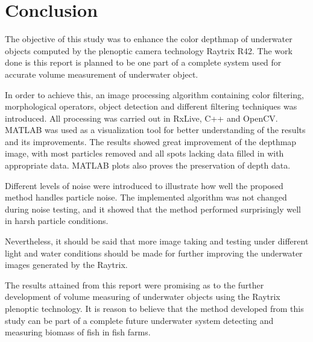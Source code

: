 \section{Conclusion}\label{conclusion}

The objective of this study was to enhance the color depthmap of underwater objects computed by the plenoptic camera technology Raytrix R42. The work done is this report is planned to be one part of a complete system used for accurate volume measurement of underwater object. 

In order to achieve this, an image processing algorithm containing color filtering, morphological operators, object detection and different filtering techniques was introduced. All processing was carried out in RxLive, C++ and OpenCV. MATLAB was used as a visualization tool for better understanding of the results and its improvements. The results showed great improvement of the depthmap image, with most particles removed and all spots lacking data filled in with appropriate data. MATLAB plots also proves the preservation of depth data.

Different levels of noise were introduced to illustrate how well the proposed method handles particle noise. The implemented algorithm was not changed during noise testing, and it showed that the method performed surprisingly well in harsh particle conditions. 

Nevertheless, it should be said that more image taking and testing under different light and water conditions should be made for further improving the underwater images generated by the Raytrix.

The results attained from this report were promising as to the further development of volume measuring of underwater objects using the Raytrix plenoptic technology. It is reason to believe that the method developed from this study can be part of a complete future underwater system detecting and measuring biomass of fish in fish farms. 



